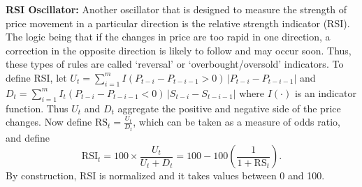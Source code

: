 \noindent\textbf{RSI Oscillator:} Another oscillator that is designed to measure the strength of price movement in a particular direction is the relative strength indicator (RSI). The logic being that if the changes in price are too rapid in one direction, a correction in the opposite direction is likely to follow and may occur soon. Thus, these types of rules are called `reversal' or `overbought/oversold' indicators. To define RSI, let $U_{t} = \sum_{i=1}^m I(P_{t-i} - P_{t-i-1} > 0)\,\lvert P_{t-i} - P_{t-i-1} \rvert$ and $D_{t} = \sum_{i=1}^m I_{t} (P_{t-i} - P_{t-i-1} < 0)\,\lvert S_{t-i} - S_{t-i-1}\rvert$ where $I(\cdot)$ is an indicator function. Thus $U_t$ and $D_t$ aggregate the positive and negative side of the price changes. Now define $\text{RS}_{t} = \frac {U_{t}}{D_{t}}$, which can be taken as a measure of odds ratio, and define
	\begin{equation} \label{eqn:rsi}
	\text{RSI}_{t} = 100 \times \frac{U_{t}}{U_{t} + D_{t}} = 100 - 100 \left( \dfrac{1}{1 + \text{RS}_t} \right).
	\end{equation}
By construction, RSI is normalized and it takes values between 0 and 100. \twomedskip


\noindent{} \twomedskip


